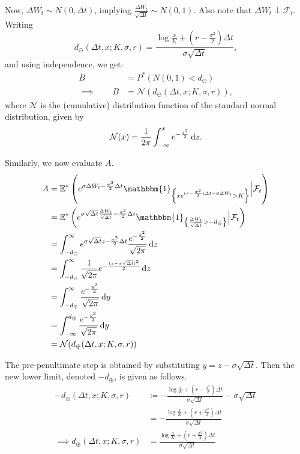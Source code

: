Now, $ \Delta W_t \sim N(0, \Delta t) $, implying $ \frac{ \Delta W_t }{ \sqrt{\Delta t} } \sim N(0, 1) $. Also note that $ \Delta W_t \perp \mathcal{F}_t $. Writing 
\begin{equation*}
	d_{\ominus} ( \Delta t, x; K, \sigma, r ) = \frac{ \log \frac{x}{K} + ( r - \frac{\sigma^2}{2} ) \Delta t }{ \sigma \sqrt{\Delta t} } ,
\end{equation*}
and using independence, we get:
\begin{align*}
	B  &=  P^* \left( N(0, 1)  <  d_{\ominus} \right)  \\
	\implies  \qquad  B  &=  \mathcal{N}(d_{\ominus} ( \Delta t, x; K, \sigma, r )),
\end{align*}
where $ \mathcal{N} $ is the (cumulative) distribution function of the standard normal distribution, given by
\begin{equation}
	\mathcal{N}(x) = \frac{1}{2 \pi} \int_{- \infty}^{x} e^{-\frac{z^2}{2}} \dif z .
\end{equation}


Similarly, we now evaluate $ A $.
\begin{align*}
	A  &=  \E^* \left( e^{ \sigma \Delta W_t - \frac{\sigma^2}{2} \Delta t }  \mathbbm{1}_{ \left\lbrace  x e^{ ( r - \frac{\sigma^2}{2} ) \Delta t + \sigma \Delta W_t } > K  \right\rbrace }  \Big|  \mathcal{F}_t \right)  \\
	&=  \E^* \left( e^{ \sigma \sqrt{\Delta t} \frac{ \Delta W_t }{ \sqrt{\Delta t} } - \frac{\sigma^2}{2} \Delta t }  \mathbbm{1}_{ \left\lbrace  \frac{ \Delta W_t }{ \sqrt{\Delta t} }  >  - d_{\ominus}  \right\rbrace }  \Big|  \mathcal{F}_t \right)  \\
	&=  \int_{- d_{\ominus}}^{\infty}  e^{ \sigma \sqrt{\Delta t} z - \frac{\sigma^2}{2} \Delta t } \frac{ e^{-\frac{z^2}{2}} }{ \sqrt{2 \pi} } \dif z  \\
	&=  \int_{- d_{\ominus}}^{\infty}  \frac{ 1 }{ \sqrt{2 \pi} }  e^{- \frac{ ( z - \sigma \sqrt{\Delta t } )^2 }{2} }  \dif z  \\
	&=  \int_{- d_{\oplus}}^{\infty}  \frac{ e^{-\frac{y^2}{2}} }{ \sqrt{2 \pi} }  \dif y  \\
	&=  \int_{- \infty}^{d_{\oplus}}  \frac{ e^{-\frac{y^2}{2}} }{ \sqrt{2 \pi} }  \dif y  \\
	&=  \mathcal{N}(d_{\oplus} ( \Delta t, x; K, \sigma, r ))
\end{align*}

The pre-penultimate step is obtained by substituting $ y = z - \sigma \sqrt{\Delta t } $. Then the new lower limit, denoted $ - d_{\oplus} $, is given as follows.
\begin{align*}
	- d_{\oplus} ( \Delta t, x; K, \sigma, r )  & \coloneqq  - \frac{ \log \frac{x}{K} + ( r - \frac{\sigma^2}{2} ) \Delta t }{ \sigma \sqrt{\Delta t} } - \sigma \sqrt{\Delta t }  \\
	&=  - \frac{ \log \frac{x}{K} + ( r + \frac{\sigma^2}{2} ) \Delta t }{ \sigma \sqrt{\Delta t} }  \\
	\implies  d_{\oplus} ( \Delta t, x; K, \sigma, r )  &=  \frac{ \log \frac{x}{K} + ( r + \frac{\sigma^2}{2} ) \Delta t }{ \sigma \sqrt{\Delta t} }
\end{align*}

